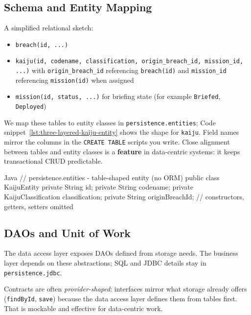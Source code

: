 \subsection{Schema and Entity Mapping}
\label{sec:three_layered_schema_entities}

A simplified relational sketch:
\begin{itemize}
    \item \texttt{breach(id, ...)}
    \item \texttt{kaiju(id, codename, classification, origin\_breach\_id, mission\_id, ...)} with \texttt{origin\_breach\_id} referencing \texttt{breach(id)} and \texttt{mission\_id} referencing \texttt{mission(id)} when assigned
    \item \texttt{mission(id, status, ...)} for briefing state (for example \texttt{Briefed}, \texttt{Deployed})
\end{itemize}

We map these tables to entity classes in \texttt{persistence.entities}; Code snippet~\ref{lst:three-layered-kaiju-entity} shows the shape for \texttt{kaiju}. Field names mirror the columns in the \texttt{CREATE TABLE} scripts you write. Close alignment between tables and entity classes is a \textbf{feature} in data-centric systems: it keeps transactional CRUD predictable.\autocite{microsoft2003layered}

\begin{ridercode}{Java}
// persistence.entities - table-shaped entity (no ORM)
public class KaijuEntity
{
    private String id;
    private String codename;
    private KaijuClassification classification;
    private String originBreachId;
    // constructors, getters, setters omitted
}
\end{ridercode}
\label{lst:three-layered-kaiju-entity}

\subsection{DAOs and Unit of Work}
\label{sec:three_layered_persistence_dao_uow_java}

The data access layer exposes DAOs defined from storage needs. The business layer depends on these abstractions; SQL and JDBC details stay in \texttt{persistence.jdbc}.

Contracts are often \textit{provider-shaped}: interfaces mirror what storage already offers (\texttt{findById}, \texttt{save}) because the data access layer defines them from tables first. That is mockable and effective for data-centric work.

